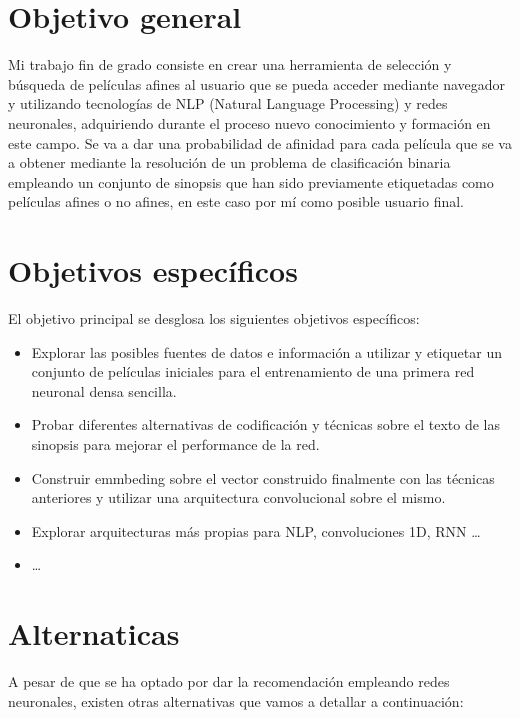 \documentclass[a4paper, 12pt]{book}
\begin{document}
\section{Objetivo general} %
\label{sec:objetivo-general} %

Mi trabajo fin de grado consiste en crear una herramienta de selección y búsqueda de películas afines al usuario que se pueda acceder mediante navegador y utilizando tecnologías de NLP (Natural Language Processing) y redes neuronales, adquiriendo durante el proceso nuevo conocimiento y formación en este campo. Se va a dar una probabilidad de afinidad para cada película que se va a obtener mediante la resolución de un problema de clasificación binaria empleando un conjunto de sinopsis que han sido previamente etiquetadas como películas afines o no afines, en este caso por mí como posible usuario final.

\section{Objetivos específicos}
\label{sec:objetivos-especificos}

El objetivo principal se desglosa los siguientes objetivos específicos:
\begin{itemize}
  \item Explorar las posibles fuentes de datos e información a utilizar y etiquetar un conjunto de películas iniciales para el entrenamiento de una primera red neuronal densa sencilla.
  
  \item Probar diferentes alternativas de codificación y técnicas sobre el texto de las sinopsis para mejorar el performance de la red.
  
  \item Construir emmbeding sobre el vector construido finalmente con las técnicas anteriores y utilizar una arquitectura convolucional sobre el mismo.
  
  \item Explorar arquitecturas más propias para NLP, convoluciones 1D, RNN \ldots
  
  \item \ldots
\end{itemize}


\section{Alternaticas}
\label{sec:alternativas}
A pesar de que se ha optado por dar la recomendación empleando redes neuronales, existen otras alternativas que vamos a detallar a continuación:
\end{document}
